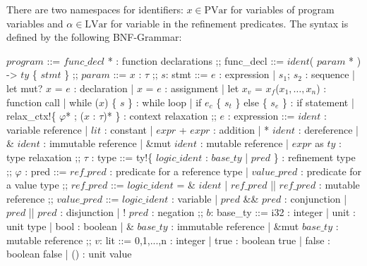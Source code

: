 \documentclass{book}
\newcommand{\ccolon}[0]{: }
\newcommand{\cmid}[0]{| }
\newcommand{\cdisj}[0]{|| }
\theoremstyle{definition}
\begin{document}
There are two namespaces for identifiers: $x \in \text{PVar}$ for variables of program variables and $\alpha \in \text{LVar}$ for variable in the refinement predicates. The syntax is defined by the following BNF-Grammar:

\begin{bnfgrammar}
  $program$  ::=
    $func\_decl$ * : function declarations
  ;;
  func\_decl ::=
    $ident$( $param$ * ) -> $ty$ \{ $stmt$ \}
  ;;
  $param$ ::= $x$ \ccolon  $\tau$
  ;;
  $s$: stmt 
  ::=
    $e$                                                   : expression
    | $s_1$; $s_2$                                        : sequence
    | let mut? $x$ = $e$                                  : declaration
    | $x$ = $e$                                           : assignment
    | let $x_v$ = $x_f$($x_1, \dots, x_n$)                : function call
    | while ($x$) \{ $s$ \}                               : while loop
    | if $e_c$ \{ $s_t$ \} else \{ $s_e$ \}               : if statement
    | relax\_ctx!\{ $\varphi$* ; ($x$ \ccolon $\tau$)* \} : context relaxation
  ;;
  $e$                                              : expression 
  ::=
    $ident$                                         : variable reference
    | $lit$                                         : constant
    | $expr$ + $expr$                               : addition
    | * $ident$                                     : dereference
    | \& $ident$                                    : immutable reference
    | \&mut $ident$                                 : mutable reference
    | $expr$ as $ty$                                : type relaxation
  ;;
  $\tau$ : type ::= ty!\{ $logic\_ident$ \ccolon $base\_ty$ \cmid $pred$ \} : refinement type
  ;;
  $\varphi$ : pred ::=
    $ref\_pred$                                     : predicate for a reference type
    | $value\_pred$                                 : predicate for a value type
  ;;
  $ref\_pred$ ::=
    $logic\_ident$ = \& $ident$
    | $ref\_pred$ \cdisj $ref\_pred$         : mutable reference
  ;;
  $value\_pred$ ::=
    $logic\_ident$                : variable
  | $pred$ \&\& $pred$            : conjunction
  | $pred$ \cdisj $pred$          : disjunction
  | ! $pred$                      : negation
  ;;
  $b$: base\_ty ::=
    i32                     : integer
    | unit                  : unit type
    | bool                  : boolean
    | \& $base\_ty$         : immutable reference
    | \&mut $base\_ty$      : mutable reference
  ;;
  $v$: lit ::=
      0,1,...,n             : integer
    | true                  : boolean true
    | false                 : boolean false
    | ()                    : unit value
\end{bnfgrammar}
\end{document}
